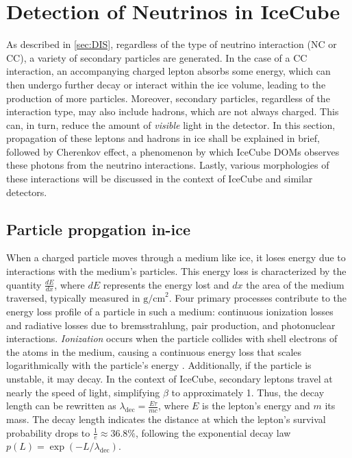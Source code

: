 \section{Detection of Neutrinos in IceCube}
\label{sec:nu_detcetion_ic}
As described in \ref{sec:DIS}, regardless of the type of neutrino interaction (NC or CC), a variety of secondary particles are generated. In the case of a CC interaction, an accompanying charged lepton absorbs some energy, which can then undergo further decay or interact within the ice volume, leading to the production of more particles. Moreover, secondary particles, regardless of the interaction type, may also include hadrons, which are not always charged. This can, in turn, reduce the amount of \emph{visible} light in the detector. In this section, propagation of these leptons and hadrons in ice shall be explained in brief, followed by Cherenkov effect, a phenomenon by which IceCube DOMs observes these photons from the neutrino interactions. Lastly, various morphologies of these interactions will be discussed in the context of IceCube and similar detectors.

\subsection{Particle propgation in-ice}
\label{sec:particle_propgation}
When a charged particle moves through a medium like ice, it loses energy due to interactions with the medium's particles. This energy loss is characterized by the quantity $ \frac{dE}{dx} $, where $ dE $ represents the energy lost and $ dx $ the area of the medium traversed, typically measured in $\text{g/cm}^2$. Four primary processes contribute to the energy loss profile of a particle in such a medium: continuous ionization losses and radiative losses due to bremsstrahlung, pair production, and photonuclear interactions. \emph{Ionization} occurs when the particle collides with shell electrons of the atoms in the medium, causing a continuous energy loss that scales logarithmically with the particle's energy . Additionally, if the particle is unstable, it may decay. In the context of IceCube, secondary leptons travel at nearly the speed of light, simplifying $ \beta $ to approximately 1. Thus, the decay length can be rewritten as $ \lambda_{\text{dec}} = \frac{E\tau}{mc} $, where $ E $ is the lepton's energy and $ m $ its mass. The decay length indicates the distance at which the lepton's survival probability drops to $ \frac{1}{e} \approx 36.8\% $, following the exponential decay law $ p(L) = \exp(-L/\lambda_{\text{dec}}) $.

